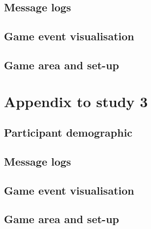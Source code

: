 \section{Message logs}

\section{Game event visualisation}

\section{Game area and set-up}

\chapter{Appendix to study 3}

\section{Participant demographic}

\section{Message logs}

\section{Game event visualisation}

\section{Game area and set-up}
